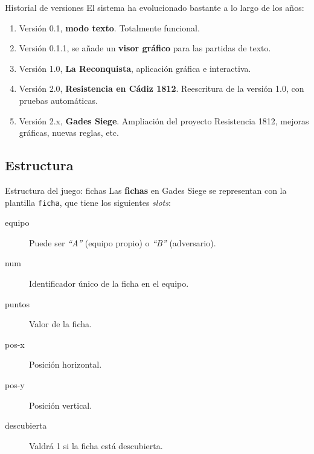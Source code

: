 \documentclass[smaller,spanish,xcolor=svgnames]{beamer}
\begin{document}
\begin{frame}{Historial de versiones}
El sistema ha evolucionado bastante a lo largo de los años:
\begin{enumerate}
\item Versión 0.1, \textbf{modo texto}. Totalmente funcional.
\item Versión 0.1.1, se añade un \textbf{visor gráfico} para las partidas de texto.
\item Versión 1.0, \textbf{La Reconquista}, aplicación gráfica e interactiva.
\item Versión 2.0, \textbf{Resistencia en Cádiz 1812}. Reescritura de la versión 1.0, con
  pruebas automáticas.
\item Versión 2.x, \textbf{Gades Siege}. Ampliación del proyecto Resistencia 1812,
  mejoras gráficas, nuevas reglas, etc.
\end{enumerate}  
\end{frame}

\subsection{Estructura}

\begin{frame}[fragile]{Estructura del juego: fichas}
  Las \textbf{fichas} en Gades Siege se representan con la plantilla \texttt{ficha}, que
  tiene los siguientes \textit{slots}:
  \begin{description}
  \item[equipo] Puede ser \textit{``A''} (equipo propio) o \textit{``B''} (adversario).
  \item[num] Identificador único de la ficha en el equipo.
  \item[puntos] Valor de la ficha.
  \item[pos-x] Posición horizontal.
  \item[pos-y] Posición vertical.
  \item[descubierta] Valdrá 1 si la ficha está descubierta.
  \end{description}  
\end{frame}
\end{document}
